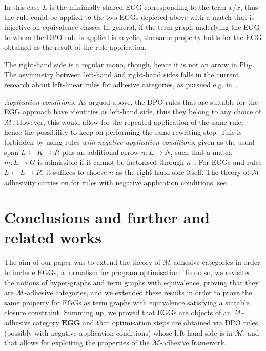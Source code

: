 \documentclass[a4paper,UKenglish,cleveref,pdftex,thm-restate,numberwithinsect]{lipics-v2021}
\newcommand{\pbc}{\mathsf{Pb}}
\newcommand{\eg}[0]{\mathbf{EGG}}
\begin{document}
\noindent
In this case $L$ is the minimally shared EGG corresponding to the term $x / x$,
thus the rule could be applied to the two EGGs
depicted above with a match that is injective on equivalence classes 
%
In general, if the term graph underlying the EGG to whom the DPO rule is applied is acyclic,
the same property holds for the EGG obtained as the result of the rule application.
%

The right-hand side is a regular mono, though, hence it is not an arrow in $\pbc_\Sigma$.
The asymmetry between left-hand and right-hand sides falls in the current research about left-linear rules for 
adhesive categories, as pursued e.g. in~\cite{BaldanC0G24}.

\emph{Application conditions.} 
As argued above, the DPO rules that are suitable for the EGG approach have identities as left-hand side,
thus they belong to any choice of $\mathcal{M}$.
%
However, this would allow for the repeated application of the same rule, hence the 
possibility to keep on performing the same rewriting step.
This is forbidden by using rules \emph{with negative application conditions}, given as the usual span 
$L \leftarrow K \rightarrow R$ plus an additional arrow $n: L\rightarrow N$, such that a match $m: L \to G$ is admissible if it cannot
be factorised through $n$~\cite{HabelHT96}. For EGGs and rules $L \leftarrow L \rightarrow R$, it suffices to choose $n$ as the right-hand side itself.
%
The theory of $\mathcal{M}$-adhesivity carries on for rules with negative application conditions, see~\cite{ehrig2012,ehrig2014adhesive}.

\section{Conclusions and further and related works}
\label{conclusioni}
The aim of our paper was to extend the theory of $\mathcal{M}$-adhesive categories in order to include EGGs, 
a formalism for program optimisation. 
%
To do so, we revisited the notions of hyper-graphs and term graphs with equivalence, 
proving that they are $\mathcal{M}$-adhesive categories, and we extended these results in order to
prove the same property for EGGs as term graphs with equivalence satisfying a suitable closure constraint.
Summing up, we proved that EGGs are objects of an $\mathcal{M}$-adhesive category $\eg$ 
and that optimisation steps are obtained via DPO rules (possibly with negative application conditions) whose 
left-hand side is in $\mathcal{M}$,
and that allows for exploiting the properties 
of the $\mathcal{M}$-adhesive framework.
\end{document}
